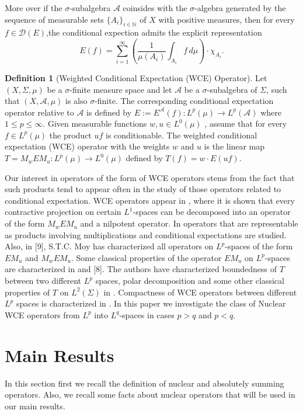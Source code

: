 \documentclass{amsart}
\theoremstyle{definition}\newtheorem{defn}[thm]{Definition}
\theoremstyle{remark}
\numberwithin{equation}{section}
\newcommand{\A}{\mathcal{A}}
\begin{document}
More over if the $\sigma$-subalgebra $\A$ coinsides with the $\sigma$-algebra generated by the sequence of measurable sets $\{A_i\}_{i \in \mathbb N}$ of $X$ with positive measures, then for every $f \in \mathcal{D}(E)$,the conditional expection admits the explicit representation
\[
E(f) = \sum_{i=1}^{\infty} \left( \frac{1}{\mu(A_i)} \int_{A_i} f \, d\mu \right) \cdot \chi_{A_i}.
\]

\begin{defn}
[Weighted Conditional Expectation (WCE) Operator]
Let $(X, \Sigma, \mu)$ be a $\sigma$-finite measure space and let $\A$ be a $\sigma$-subalgebra of $\Sigma$, such that $(X, \A, \mu)$ is also $\sigma$-finite. The corresponding conditional expectation operator relative to $\A$ is defined by $E:= E^{\A}(f) : L^p(\mu) \to L^p(\A)$ where $1 \leq p \leq \infty$. Given measurable functions $w, u \in L^0(\mu)$ , assume that for every  $f \in L^p(\mu)$ the product $uf$ is conditionable. The weighted conditional expectation (WCE) operator with the weights $w$ and $u$ is the linear map $T =M_w E M_u : L^p(\mu) \to L^0(\mu)$ defined by $T(f) = w\cdot E(uf)$.
\end{defn}
Our interest in operators of the form of WCE operators stems from the fact that such products tend to appear often
in the study of those operators related to conditional expectation. WCE operators appear in \cite{dou}, where it is shown that every contractive projection on certain $L^1$-spaces can be
decomposed into an operator of the form $M_wEM_u$ and a nilpotent operator. In \cite{gdp,gdp1,Herron2011} operators that are
representable as products involving multiplications and conditional expectations are studied. Also, in [9],
S.T.C. Moy has characterized all operators on $L^p$-spaces of the form $EM_u$ and $M_wEM_u$. Some classical properties
of the operator $EM_u$ on $L^p$-spaces are characterized in \cite{Herron2011} and [8]. The authors have characterized
boundedness of $T$ between two different $L^p$ spaces, polar decomposition and some other classical properties of $T$
on $L^2(\Sigma)$ in \cite{Estaremi2013}. Compactness of WCE operators between different $L^p$ spaces is characterized in \cite{Estaremi2014}. In this paper we investigate the class of Nuclear WCE operators from $L^p$ into  $L^q$-spaces in cases $p>q$ and $p<q$.






\section{ \sc\bf Main Results}
In this section first we recall the definition of nuclear and absolutely summing operators. Also, we recall some facts about nuclear operators that will be used in our main results.\\
\end{document}
